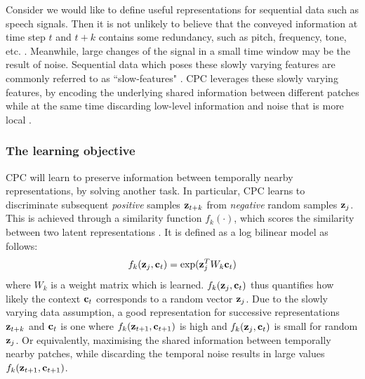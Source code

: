 	Consider we would like to define useful representations for sequential data such as speech signals. Then it is not unlikely to believe that the conveyed information at time step $t$ and $t+k$ contains some redundancy, such as pitch, frequency, tone, etc. \citep{raoUnderstandingGradientIsolatedLearning2020}. Meanwhile, large changes of the signal in a small time window may be the result of noise. Sequential data which poses these slowly varying features are commonly referred to as ``slow-features" \citep{zhangSlowFeatureAnalysis2012}. CPC leverages these slowly varying features, by encoding the underlying shared information between different patches while at the same time discarding low-level information and noise that is more local \citep{oordRepresentationLearningContrastive2019}.


\subsubsection{The learning objective}
	
	
	CPC will learn to preserve information between temporally nearby representations, by solving another task. In particular, CPC learns to discriminate subsequent \textit{positive} samples $\mathbf{z}_{t+k}$ from \textit{negative} random samples $\mathbf{z}_j$. This is achieved through a similarity function $f_k(\cdot)$, which scores the similarity between two latent representations \citep{lowePuttingEndEndtoEnd2020a}. It is defined as a log bilinear model as follows:
	\begin{equation} %
		\fkdefinition \label{eq:fk}
	\end{equation}
	where $W_k$ is a weight matrix which is learned. $f_k( \mathbf{z}_j , \mathbf{c}_t )$ thus quantifies how likely the context $\mathbf{c}_t$ corresponds to a random vector $\mathbf{z}_j$. Due to the slowly varying data assumption, a good representation for successive representations $\mathbf{z}_{t+k}$ and $\mathbf{c}_t$ is one where $f_k( \mathbf{z}_{t+1}, \mathbf{c}_{t+1})$ is high and $f_k( \mathbf{z}_j, \mathbf{c}_t)$ is small for random $\mathbf{z}_j$. Or equivalently, maximising the shared information between temporally nearby patches, while discarding the temporal noise results in large values $f_k( \mathbf{z}_{t+1}, \mathbf{c}_{t+1})$.
	
